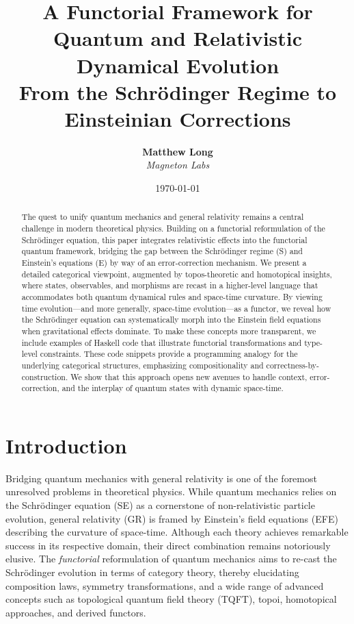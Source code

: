 \documentclass[12pt]{article}
\title{\textbf{A Functorial Framework for Quantum and Relativistic Dynamical Evolution}\\
       \large \textbf{From the Schr\"odinger Regime to Einsteinian Corrections}}
\author{
  \textbf{Matthew Long} \\
  \emph{Magneton Labs}
}
\date{\today}
\begin{document}
\maketitle

\begin{abstract}
The quest to unify quantum mechanics and general relativity remains a central challenge in modern theoretical physics. Building on a functorial reformulation of the Schr\"odinger equation, this paper integrates relativistic effects into the functorial quantum framework, bridging the gap between the Schr\"odinger regime (S) and Einstein's equations (E) by way of an error-correction mechanism. We present a detailed categorical viewpoint, augmented by topos-theoretic and homotopical insights, where states, observables, and morphisms are recast in a higher-level language that accommodates both quantum dynamical rules and space-time curvature. By viewing time evolution---and more generally, space-time evolution---as a functor, we reveal how the Schr\"odinger equation can systematically morph into the Einstein field equations when gravitational effects dominate. To make these concepts more transparent, we include examples of Haskell code that illustrate functorial transformations and type-level constraints. These code snippets provide a programming analogy for the underlying categorical structures, emphasizing compositionality and correctness-by-construction. We show that this approach opens new avenues to handle context, error-correction, and the interplay of quantum states with dynamic space-time.
\end{abstract}

\tableofcontents

\section{Introduction}
Bridging quantum mechanics with general relativity is one of the foremost unresolved problems in theoretical physics. While quantum mechanics relies on the Schr\"odinger equation (SE) as a cornerstone of non-relativistic particle evolution, general relativity (GR) is framed by Einstein's field equations (EFE) describing the curvature of space-time. Although each theory achieves remarkable success in its respective domain, their direct combination remains notoriously elusive. The \emph{functorial} reformulation of quantum mechanics aims to re-cast the Schr\"odinger evolution in terms of category theory, thereby elucidating composition laws, symmetry transformations, and a wide range of advanced concepts such as topological quantum field theory (TQFT), topoi, homotopical approaches, and derived functors.
\end{document}
